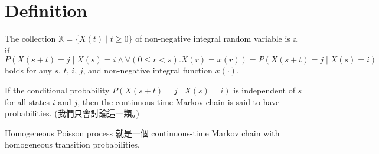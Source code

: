 \section{Definition}

\begin{definition}
The collection $ \mathbb{X} = \{ X(t) \mid t \ge 0 \} $ of non-negative integral random variable is a  if
\[ P(X(s + t) = j \mid X(s) = i \wedge \forall(0 \le r < s) .X(r) = x(r)) = P(X(s + t) = j \mid X(s) = i) \]
holds for any $ s $, $ t $, $ i $, $ j $, and non-negative integral function $ x(\cdot) $.
\begin{comment}
Non-homogeneous Poisson process with intensity function $ \lambda(\cdot) $ is a continuous-time Markov chain given $ N(s) = n $, the number of events in time $ [s, s + t] $ is a Poisson distribution with parameter
\[ \int_{s}^{s + t} \lambda(x) \mathrm{d}x, \]
having nothing to do with $ N(s - \epsilon) $ for all $ \epsilon \ge 0 $.
\end{comment}
\end{definition}

\begin{definition}
If the conditional probability $ P(X(s + t) = j \mid X(s) = i) $ is independent of $ s $ for all states $ i $ and $ j $, then the continuous-time Markov chain is said to have  probabilities. (我們只會討論這一類。)
\end{definition}

\begin{example}
Homogeneous Poisson process 就是一個 continuous-time Markov chain with homogeneous transition probabilities.
\end{example}

